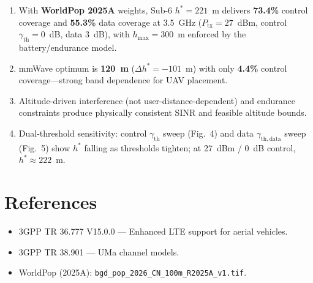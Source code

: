 \documentclass[11pt,a4paper]{article}
\begin{document}
\begin{enumerate}
  \item With \textbf{WorldPop 2025A} weights, Sub-6 $h^\ast = 221$~m delivers
        \textbf{73.4\%} control coverage and \textbf{55.3\%} data coverage at 3.5~GHz
        ($P_{\mathrm{tx}}=27$~dBm, control $\gamma_{\mathrm{th}}=0$~dB, data $3$~dB),
        with $h_{\max}=300$~m enforced by the battery/endurance model.
  \item mmWave optimum is \textbf{120~m} ($\Delta h^\ast = -101$~m) with only
        \textbf{4.4\%} control coverage---strong band dependence for UAV placement.
  \item Altitude-driven interference (not user-distance-dependent) and endurance
        constraints produce physically consistent SINR and feasible altitude bounds.
  \item Dual-threshold sensitivity: control $\gamma_{\mathrm{th}}$ sweep (Fig.~4) and
        data $\gamma_{\mathrm{th,data}}$ sweep (Fig.~5) show $h^\ast$ falling as
        thresholds tighten; at 27~dBm / 0~dB control, $h^\ast \approx 222$~m.
\end{enumerate}

\section*{References}
\begin{itemize}[noitemsep]
  \item 3GPP TR 36.777 V15.0.0 --- Enhanced LTE support for aerial vehicles.
  \item 3GPP TR 38.901 --- UMa channel models.
  \item WorldPop (2025A): \texttt{bgd\_pop\_2026\_CN\_100m\_R2025A\_v1.tif}.
\end{itemize}
\end{document}
